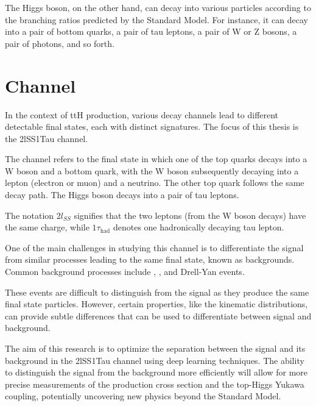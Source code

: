 The Higgs boson, on the other hand, can decay into various particles according to the branching ratios predicted by the
Standard Model. For instance, it can decay into a pair of bottom quarks, a pair of tau leptons, a pair of W or Z bosons,
a pair of photons, and so forth.

\section{\lss Channel}

In the context of ttH production, various decay channels lead to different detectable final states, each with distinct
signatures. The focus of this thesis is the 2lSS1Tau channel.

The \lss channel refers to the final state in which one of the top quarks decays into a W boson and a bottom quark, with
the W boson subsequently decaying into a lepton (electron or muon) and a neutrino. The other top quark follows the same
decay path. The Higgs boson decays into a pair of tau leptons.

The notation $2l_{SS}$ signifies that the two leptons (from the W boson decays) have the same charge, while
$1\tau_\text{had}$ denotes one hadronically decaying tau lepton.

One of the main challenges in studying this channel is to differentiate the \ttH signal from similar processes leading
to the same final state, known as backgrounds. Common background processes include \ttW, \ttZ, and Drell-Yan events.

These events are difficult to distinguish from the \ttH signal as they produce the same final state particles. However,
certain properties, like the kinematic distributions, can provide subtle differences that can be used to differentiate
between signal and background.

The aim of this research is to optimize the separation between the \ttH signal and its background in the 2lSS1Tau
channel using deep learning techniques. The ability to distinguish the signal from the background more efficiently will
allow for more precise measurements of the \ttH production cross section and the top-Higgs Yukawa coupling, potentially
uncovering new physics beyond the Standard Model.